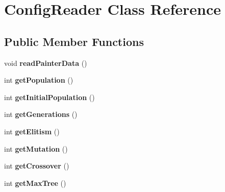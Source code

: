 \hypertarget{class_config_reader}{\section{Config\-Reader Class Reference}
\label{class_config_reader}
}
\subsection*{Public Member Functions}
\begin{DoxyCompactItemize}
\item 
\hypertarget{class_config_reader_aa525c738a01392f1fa61b05a2f16063a}{void {\bfseries read\-Painter\-Data} ()}\label{class_config_reader_aa525c738a01392f1fa61b05a2f16063a}

\item 
\hypertarget{class_config_reader_ad2c2a7bfc19b76357dc91d9def4c7992}{int {\bfseries get\-Population} ()}\label{class_config_reader_ad2c2a7bfc19b76357dc91d9def4c7992}

\item 
\hypertarget{class_config_reader_a5c2411ee0c0677015b9655dc7360c97e}{int {\bfseries get\-Initial\-Population} ()}\label{class_config_reader_a5c2411ee0c0677015b9655dc7360c97e}

\item 
\hypertarget{class_config_reader_a50cb73d4e053df9a16c16a6a650da147}{int {\bfseries get\-Generations} ()}\label{class_config_reader_a50cb73d4e053df9a16c16a6a650da147}

\item 
\hypertarget{class_config_reader_aaf6399eb399499490eae48fe29fe99eb}{int {\bfseries get\-Elitism} ()}\label{class_config_reader_aaf6399eb399499490eae48fe29fe99eb}

\item 
\hypertarget{class_config_reader_a9bb987d15fa1f2d13f7ada58e03e0a43}{int {\bfseries get\-Mutation} ()}\label{class_config_reader_a9bb987d15fa1f2d13f7ada58e03e0a43}

\item 
\hypertarget{class_config_reader_a1e2ade167d3e28489b4e2dc37242b8fd}{int {\bfseries get\-Crossover} ()}\label{class_config_reader_a1e2ade167d3e28489b4e2dc37242b8fd}

\item 
\hypertarget{class_config_reader_ae707de59f1e1c32bfa8f4961247758f6}{int {\bfseries get\-Max\-Tree} ()}\label{class_config_reader_ae707de59f1e1c32bfa8f4961247758f6}


\end{DoxyCompactItemize}
